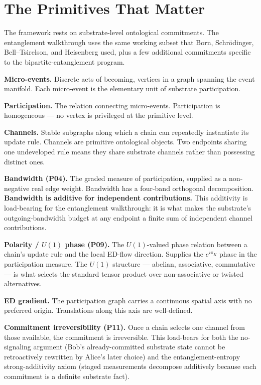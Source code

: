 \documentclass[11pt,a4paper]{article}
\begin{document}
\section{The Primitives That Matter}

The framework rests on substrate-level ontological commitments. The entanglement walkthrough uses the same working subset that Born, Schr\"odinger, Bell--Tsirelson, and Heisenberg used, plus a few additional commitments specific to the bipartite-entanglement program.

\textbf{Micro-events.} Discrete acts of becoming, vertices in a graph spanning the event manifold. Each micro-event is the elementary unit of substrate participation.

\textbf{Participation.} The relation connecting micro-events. Participation is homogeneous --- no vertex is privileged at the primitive level.

\textbf{Channels.} Stable subgraphs along which a chain can repeatedly instantiate its update rule. Channels are primitive ontological objects. Two endpoints sharing one undeveloped rule means they share substrate channels rather than possessing distinct ones.

\textbf{Bandwidth (P04).} The graded measure of participation, supplied as a non-negative real edge weight. Bandwidth has a four-band orthogonal decomposition. \textbf{Bandwidth is additive for independent contributions.} This additivity is load-bearing for the entanglement walkthrough: it is what makes the substrate's outgoing-bandwidth budget at any endpoint a finite sum of independent channel contributions.

\textbf{Polarity / $U(1)$ phase (P09).} The $U(1)$-valued phase relation between a chain's update rule and the local ED-flow direction. Supplies the $e^{i\pi_K}$ phase in the participation measure. The $U(1)$ structure --- abelian, associative, commutative --- is what selects the standard tensor product over non-associative or twisted alternatives.

\textbf{ED gradient.} The participation graph carries a continuous spatial axis with no preferred origin. Translations along this axis are well-defined.

\textbf{Commitment irreversibility (P11).} Once a chain selects one channel from those available, the commitment is irreversible. This load-bears for both the no-signaling argument (Bob's already-committed substrate state cannot be retroactively rewritten by Alice's later choice) and the entanglement-entropy strong-additivity axiom (staged measurements decompose additively because each commitment is a definite substrate fact).
\end{document}
